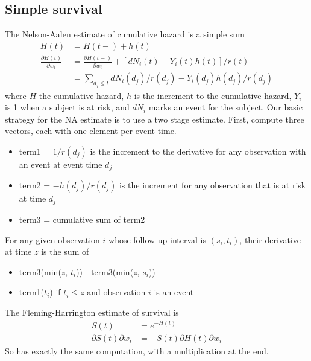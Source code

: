 \documentclass{article}
\begin{document}
\subsection{Simple survival}
The Nelson-Aalen estimate of cumulative hazard is a simple sum
\begin{align}
  H(t) &= H(t-) + h(t) \nonumber \\
  \frac{\partial H(t)}{\partial w_i} &= \frac{\partial H(t-)}{\partial w_i} +
       [dN_i(t) - Y_i(t)h(t)]/r(t) \nonumber \\
       &= \sum_{d_j \le t} dN_i(d_j)/r(d_j) - Y_i(d_j)h(d_j)/r(d_j) 
         \label{NAderiv}
\end{align}
where $H$ the cumulative hazard, 
$h$ is the increment to the cumulative hazard, $Y_i$ is 1 when a
subject is at risk, and $dN_i$ marks an event for the subject.
Our basic strategy for the NA estimate is to use a two stage estimate.
First, compute three vectors, each with one element per event time.
\begin{itemize}
  \item term1 = $1/r(d_j)$ is the increment to the derivative for any
    observation with an event at event time $d_j$
  \item term2 = $-h(d_j)/r(d_j)$ is the increment for any observation that is at
    risk at time $d_j$
  \item term3 = cumulative sum of term2
\end{itemize}

For any given observation $i$ whose follow-up interval is $(s_i, t_i)$, their
derivative at time $z$ is the sum of
\begin{itemize}
  \item term3(min($z$, $t_i$)) - term3(min($z$, $s_i$))
  \item term1($t_i$) if $t_i \le z$ and observation $i$ is an event
\end{itemize}

The Fleming-Harrington estimate of survival is 
\begin{align*}
  S(t) &= e^{-H(t)} \\
  \partial{S(t)}{\partial w_i} &=  -S(t)\partial{H(t)}{\partial w_i} 
\end{align*}
So has exactly the same computation, with a multiplication at the end.
\end{document}
